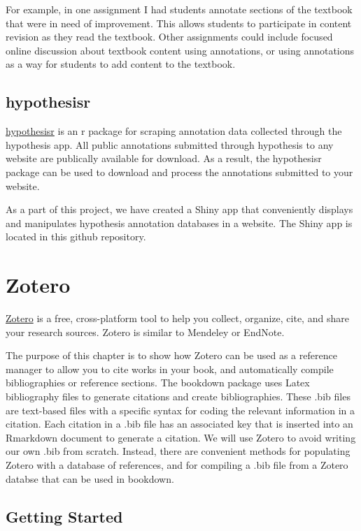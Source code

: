 \documentclass[]{book}
\theoremstyle{definition}
\theoremstyle{definition}
\theoremstyle{definition}
\theoremstyle{remark}
\begin{document}
For example, in one assignment I had students annotate sections of the
textbook that were in need of improvement. This allows students to
participate in content revision as they read the textbook. Other
assignments could include focused online discussion about textbook
content using annotations, or using annotations as a way for students to
add content to the textbook.

\section{hypothesisr}\label{hypothesisr-1}

\href{https://github.com/mdlincoln/hypothesisr}{hypothesisr} is an r
package for scraping annotation data collected through the hypothesis
app. All public annotations submitted through hypothesis to any website
are publically available for download. As a result, the hypothesisr
package can be used to download and process the annotations submitted to
your website.

As a part of this project, we have created a Shiny app that conveniently
displays and manipulates hypothesis annotation databases in a website.
The Shiny app is located in this github repository.

\chapter{Zotero}\label{zotero-1}

\href{https://www.zotero.org}{Zotero} is a free, cross-platform tool to
help you collect, organize, cite, and share your research sources.
Zotero is similar to Mendeley or EndNote.

The purpose of this chapter is to show how Zotero can be used as a
reference manager to allow you to cite works in your book, and
automatically compile bibliographies or reference sections. The bookdown
package uses Latex bibliography files to generate citations and create
bibliographies. These .bib files are text-based files with a specific
syntax for coding the relevant information in a citation. Each citation
in a .bib file has an associated key that is inserted into an Rmarkdown
document to generate a citation. We will use Zotero to avoid writing our
own .bib from scratch. Instead, there are convenient methods for
populating Zotero with a database of references, and for compiling a
.bib file from a Zotero databse that can be used in bookdown.

\section{Getting Started}\label{getting-started-1}
\end{document}
